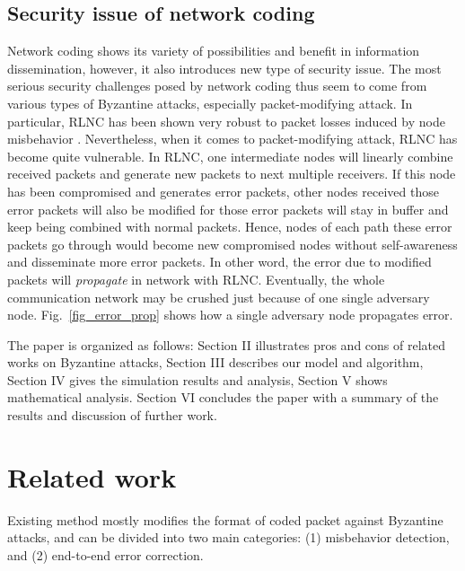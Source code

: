 \documentclass[conference]{IEEEtran}
\begin{document}
\subsection{Security issue of network coding}
Network coding shows its variety of possibilities and benefit in information dissemination, however, it also introduces new type of security issue. The most serious security challenges posed by network coding thus seem to come from various types of Byzantine attacks, especially packet-modifying attack. In particular, RLNC has been shown very robust to packet losses induced by node misbehavior \cite{RLNCrobusttoloss}. Nevertheless, when it comes to packet-modifying attack, RLNC has become quite vulnerable. In RLNC, one intermediate nodes will linearly combine received packets and generate new packets to next multiple receivers. If this node has been compromised and generates error packets, other nodes received those error packets will also be modified for those error packets will stay in buffer and keep being combined with normal packets. Hence, nodes of each path these error packets go through would become new compromised nodes without self-awareness and disseminate more error packets. In other word, the error due to modified packets will \emph{propagate} in network with RLNC. Eventually, the whole communication network may be crushed just because of one single adversary node. Fig.~\ref{fig_error_prop} shows how a single adversary node propagates error.


The paper is organized as follows: Section II illustrates pros and cons of related works on Byzantine attacks, Section III describes our model and algorithm, Section IV gives the simulation results and analysis, Section V shows mathematical analysis. Section VI concludes the paper with a summary of the results and discussion of further work.


\section{Related work}
Existing method mostly modifies the format of coded packet against Byzantine attacks, and can be divided into two main categories: (1) misbehavior detection, and (2) end-to-end error correction.
\end{document}
